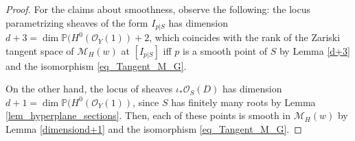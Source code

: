 \documentclass[11pt]{amsart}
\theoremstyle{definition}
\newcommand{\sO}{\mathcal{O}}
\newcommand{\sM}{\mathcal{M}}
\newcommand{\sI}{\mathcal{I}}
\begin{document}
\begin{proof}

For the claims about smoothness, observe the following: the locus parametrizing sheaves of the form $I_{p|S}$ has dimension $d+3=\dim \mathbb P (H^0(\sO_{Y}(1))+2$, which coincides with the rank of the Zariski tangent space of $\sM_H(w)$ at $[I_{p|S}]$ iff $p$ is a smooth point of $S$ by Lemma \ref{d+3} and the isomorphism \eqref{eq_Tangent_M_G}.

On the other hand, the locus of sheaves $\iota_*\sO_S(D)$ has dimension $d+1=\dim \mathbb P (H^0(\sO_{Y}(1))$, since $S$ has finitely many roots by Lemma \ref{lem_hyperplane_sections}. Then, each of these points is smooth in $\sM_H(w)$ by Lemma \ref{dimensiond+1} and the isomorphism \eqref{eq_Tangent_M_G}.



\end{proof}
\end{document}
